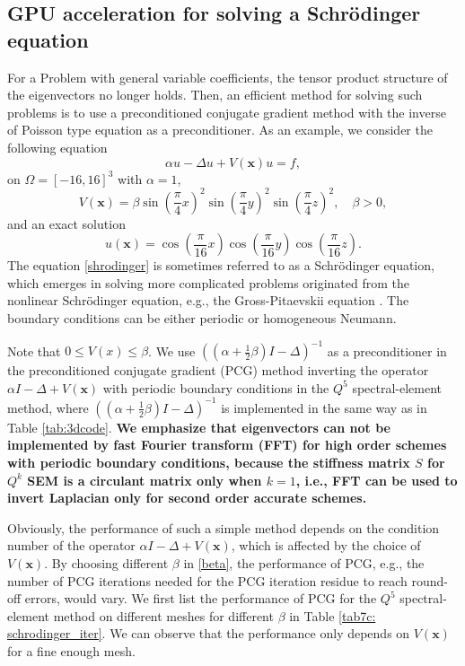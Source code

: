 \documentclass{article}
\newcommand{\bx}{\bm{x}}
\begin{document}
\subsection{GPU acceleration for solving a Schr{\"o}dinger equation}
For a Problem with general variable coefficients,   the tensor product structure of the eigenvectors no longer holds. Then, an efficient method for solving such problems is to use a preconditioned conjugate gradient method with the inverse of Poisson type equation as   a preconditioner.
As an example,
we consider the following equation
\begin{equation}
\label{shrodinger}
   \alpha u -\Delta u + V(\bx)u = f,
\end{equation}
on $\Omega=[-16,16]^3$ with   $\alpha = 1$, 
\begin{equation}
\label{beta}
    V(\bx) = \beta\sin(\frac{\pi}{4}x)^2\sin(\frac{\pi}{4}y)^2\sin(\frac{\pi}{4}z)^2,\quad \beta>0,
\end{equation}
and an exact solution 
\begin{equation}
    u(\bx) = \cos(\frac{\pi}{16} x)\cos(\frac{\pi}{16} y)\cos(\frac{\pi}{16} z).
\end{equation}
The equation \eqref{shrodinger} is sometimes referred to as a Schr{\"o}dinger equation, which emerges in solving more complicated problems originated from the nonlinear Schr{\"o}dinger equation, e.g., the Gross-Pitaevskii equation \cite{chen2023convergence}.
The boundary conditions can be either periodic or homogeneous Neumann. 

Note that $0\le V(x)\le \beta$. 
We use $((\alpha+\frac 12\beta) I - \Delta)^{-1}$ as a preconditioner in the preconditioned conjugate gradient (PCG) method inverting the operator $\alpha I - \Delta +V(\mathbf x)$ with periodic boundary conditions in the $Q^5$ spectral-element method, where $((\alpha+\frac 12\beta) I - \Delta)^{-1}$ is implemented in the same way as in Table \ref{tab:3dcode}. {\bf We emphasize that eigenvectors can not be implemented by fast Fourier transform (FFT) for high order schemes with periodic boundary conditions, because the stiffness matrix $S$ for $
Q^k$ SEM is a circulant matrix only when $k=1$, i.e., FFT can be used to invert Laplacian only for second order accurate schemes.}

Obviously, the performance of such a simple method depends on the condition number of the operator $\alpha I - \Delta +V(\mathbf x)$, which is affected by the choice of $V(\mathbf x)$.  By choosing different $\beta$ in \eqref{beta}, the performance of PCG, e.g., the number of PCG iterations needed for the PCG iteration residue to reach round-off errors, would vary. We first list the performance of PCG for the $Q^5$ spectral-element method on different meshes for different $\beta$ in Table \ref{tab7c: schrodinger_iter}. We can observe that the performance only depends on $V(\bx)$ for a fine enough mesh.  
\end{document}
